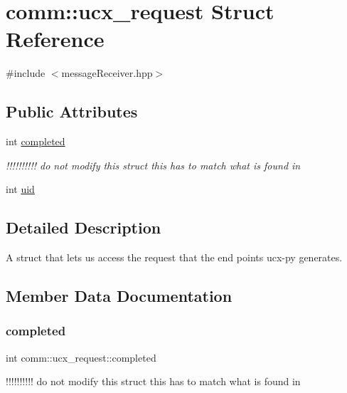 \hypertarget{structcomm_1_1ucx__request}{}\section{comm\+:\+:ucx\+\_\+request Struct Reference}
\label{structcomm_1_1ucx__request}


{\ttfamily \#include $<$message\+Receiver.\+hpp$>$}

\subsection*{Public Attributes}
\begin{DoxyCompactItemize}
\item 
int \hyperlink{structcomm_1_1ucx__request_a8242cf9e0c361bb9b626c2309cb48bab}{completed}
\begin{DoxyCompactList}\small\item\em !!!!!!!!!! do not modify this struct this has to match what is found in \end{DoxyCompactList}\item 
int \hyperlink{structcomm_1_1ucx__request_a7042a8a653b19b41f71e0726be4da6f1}{uid}
\end{DoxyCompactItemize}


\subsection{Detailed Description}
A struct that lets us access the request that the end points ucx-\/py generates. 

\subsection{Member Data Documentation}
\mbox{\label{structcomm_1_1ucx__request_a8242cf9e0c361bb9b626c2309cb48bab}} 
\subsubsection{\texorpdfstring{completed}{completed}}
{\footnotesize\ttfamily int comm\+::ucx\+\_\+request\+::completed}



!!!!!!!!!! do not modify this struct this has to match what is found in 


